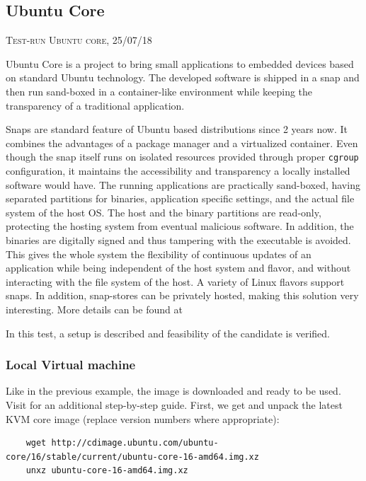 \documentclass[]{scrartcl}
\begin{document}
\subsection{Ubuntu Core}
{\small\textsc{Test-run Ubuntu core, 25/07/18} \bigskip}

Ubuntu Core is a project to bring small applications to embedded devices based on standard Ubuntu technology. The developed software is shipped in a snap and then run sand-boxed in a container-like environment while keeping the transparency of a traditional application. 

Snaps are standard feature of Ubuntu based distributions since 2 years now. It combines the advantages of a package manager and a virtualized container. Even though the snap itself runs on isolated resources provided through proper \texttt{cgroup} configuration, it maintains the accessibility and transparency a locally installed software would have. The running applications are practically sand-boxed, having separated partitions for binaries, application specific settings, and the actual file system of the host OS. The host and the binary partitions are read-only, protecting the hosting system from eventual malicious software. In addition, the binaries are digitally signed and thus tampering with the executable is avoided. This gives the whole system the flexibility of continuous updates of an application while being independent of the host system and flavor, and without interacting with the file system of the host.
A variety of Linux flavors support snaps. In addition, snap-stores can be privately hosted, making this solution very interesting. More details can be found at \cite{snap01}

In this test, a setup is described and feasibility of the candidate is verified.

\subsubsection{Local Virtual machine}

Like in the previous example, the image is downloaded and ready to be used. Visit \cite{ubuntu01} for an additional step-by-step guide.
First, we get and unpack the latest KVM core image (replace version numbers where appropriate):

\begin{verbatim}
	wget http://cdimage.ubuntu.com/ubuntu-core/16/stable/current/ubuntu-core-16-amd64.img.xz
	unxz ubuntu-core-16-amd64.img.xz
\end{verbatim}
\end{document}
